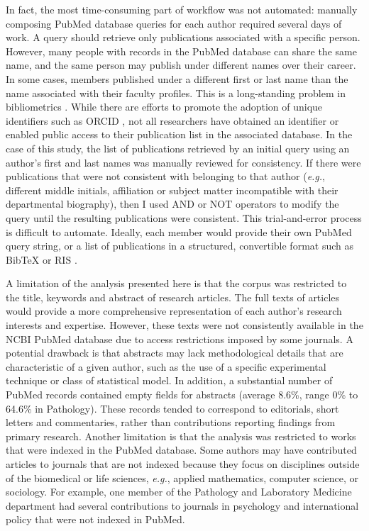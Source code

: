 \documentclass[12pt]{article}
\begin{document}
In fact, the most time-consuming part of workflow was not automated: manually composing PubMed database queries for each author required several days of work.
A query should retrieve only publications associated with a specific person.
However, many people with records in the PubMed database can share the same name, and the same person may publish under different names over their career.
In some cases, members published under a different first or last name than the name associated with their faculty profiles.
This is a long-standing problem in bibliometrics \citep{ferreira2012brief}.
While there are efforts to promote the adoption of unique identifiers such as ORCID \citep{mering2017correctly}, not all researchers have obtained an identifier or enabled public access to their publication list in the associated database.
In the case of this study, the list of publications retrieved by an initial query using an author's first and last names was manually reviewed for consistency.
If there were publications that were not consistent with belonging to that author (\textit{e.g.}, different middle initials, affiliation or subject matter incompatible with their departmental biography), then I used AND or NOT operators to modify the query until the resulting publications were consistent.
This trial-and-error process is difficult to automate.
Ideally, each member would provide their own PubMed query string, or a list of publications in a structured, convertible format such as BibTeX or RIS \citep{hull2008defrosting}. 



A limitation of the analysis presented here is that the corpus was restricted to the title, keywords and abstract of research articles.
The full texts of articles would provide a more comprehensive representation of each author's research interests and expertise.
However, these texts were not consistently available in the NCBI PubMed database due to access restrictions imposed by some journals.
A potential drawback is that abstracts may lack methodological details that are characteristic of a given author, such as the use of a specific experimental technique or class of statistical model.
In addition, a substantial number of PubMed records contained empty fields for abstracts (average 8.6\%, range 0\% to 64.6\% in Pathology).
These records tended to correspond to editorials, short letters and commentaries, rather than contributions reporting findings from primary research.
Another limitation is that the analysis was restricted to works that were indexed in the PubMed database.
Some authors may have contributed articles to journals that are not indexed because they focus on disciplines outside of the biomedical or life sciences, \textit{e.g.}, applied mathematics, computer science, or sociology.
For example, one member of the Pathology and Laboratory Medicine department had several contributions to journals in psychology and international policy that were not indexed in PubMed.
\end{document}
